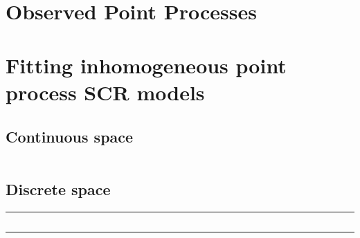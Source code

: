 \begin{gather*}
\end{gather*}


\section{Observed Point Processes}

\begin{figure}
\centering
\label{state-space.fig.hetero}
\end{figure}

\section{Fitting inhomogeneous point process SCR models}

\subsection{Continuous space}

\begin{figure}
  \centering
   \label{state-space.fig.fm1post}
\end{figure}

\begin{table}
\centering
\begin{tabular}{lrrrr}
\hline

\hline

\hline
\end{tabular}
\label{state-space.tab.simIPP}
\end{table}

\subsection{Discrete space}
\label{modeling.sec.discrete}


\begin{figure}[ht]
\centering

\label{state-space.fig.discrete}
\end{figure}

\begin{panel}
\centering
\rule[0.15in]{\textwidth}{.03in}
\begin{small}
\begin{verbatim}
\end{verbatim}
\end{small}
\rule[0.15in]{\textwidth}{.03in}
\label{state-space.panel1}
\end{panel}

